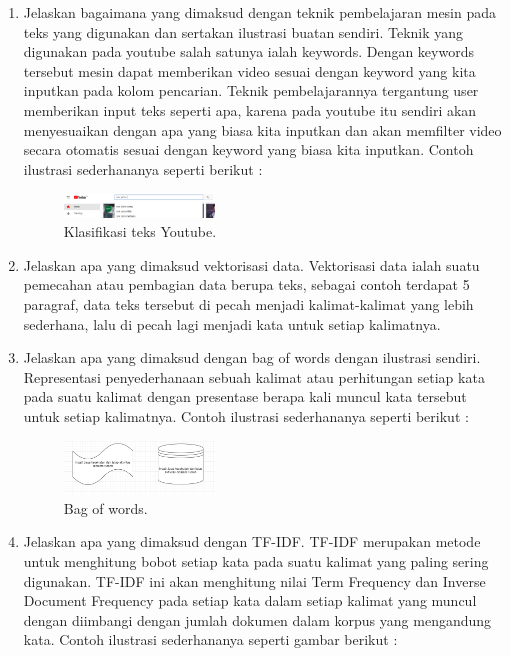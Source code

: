 \begin{enumerate}
	\item Jelaskan bagaimana yang dimaksud dengan teknik pembelajaran mesin pada teks yang digunakan dan sertakan ilustrasi buatan sendiri.
	\hfill\break
	Teknik yang digunakan pada youtube salah satunya ialah keywords. Dengan keywords tersebut mesin dapat memberikan video sesuai dengan keyword yang kita inputkan pada kolom pencarian. Teknik pembelajarannya tergantung user memberikan input teks seperti apa, karena pada youtube itu sendiri akan menyesuaikan dengan apa yang biasa kita inputkan dan akan memfilter video secara otomatis sesuai dengan keyword yang biasa kita inputkan. Contoh ilustrasi sederhananya seperti berikut :

	\begin{figure}[H]
	\centering
		\includegraphics[width=4cm]{figures/1174071/4/materi/3.PNG}
		\caption{Klasifikasi teks Youtube.}
	\end{figure}

	\item Jelaskan apa yang dimaksud vektorisasi data.
	\hfill\break
	Vektorisasi data ialah suatu pemecahan atau pembagian data berupa teks, sebagai contoh terdapat 5 paragraf, data teks tersebut di pecah menjadi kalimat-kalimat yang lebih sederhana, lalu di pecah lagi menjadi kata untuk setiap kalimatnya. 

	\item Jelaskan apa yang dimaksud dengan bag of words dengan ilustrasi sendiri.
	\hfill\break
	Representasi penyederhanaan sebuah kalimat atau perhitungan setiap kata pada suatu kalimat dengan presentase berapa kali muncul kata tersebut untuk setiap kalimatnya. Contoh ilustrasi sederhananya seperti berikut : 

	\begin{figure}[H]
	\centering
		\includegraphics[width=4cm]{figures/1174071/4/materi/4.PNG}
		\caption{Bag of words.}
	\end{figure}

	\item Jelaskan apa yang dimaksud dengan TF-IDF.
	\hfill\break
	TF-IDF merupakan metode untuk menghitung bobot setiap kata pada suatu kalimat yang paling sering digunakan. TF-IDF ini akan menghitung nilai Term Frequency dan Inverse Document Frequency pada setiap kata dalam setiap kalimat yang muncul dengan diimbangi dengan jumlah dokumen dalam korpus yang mengandung kata. Contoh ilustrasi sederhananya seperti gambar berikut : 


\end{enumerate}
